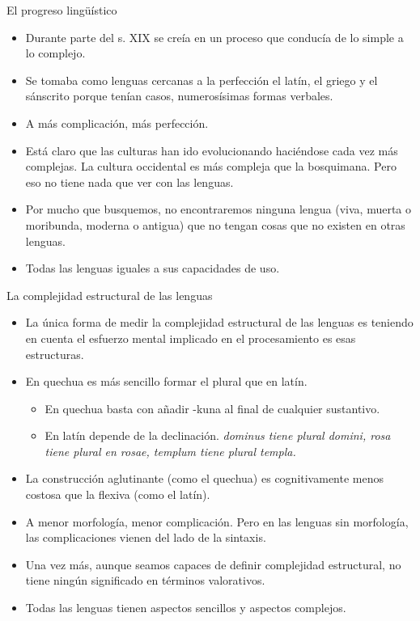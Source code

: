 \documentclass[handout]{beamer}
\begin{document}
\begin{frame}{El progreso lingüístico}
\begin{itemize}
	\item Durante parte del s. XIX se creía en un proceso que conducía de lo simple a lo complejo.
	\item Se tomaba como lenguas cercanas a la perfección el latín, el griego y el sánscrito porque tenían casos, numerosísimas formas verbales.
	\item A más complicación, más perfección.
	\item Está claro que las culturas han ido evolucionando haciéndose cada vez más complejas. La cultura occidental es más compleja que la bosquimana. Pero eso no tiene nada que ver con las lenguas.
	\item Por mucho que busquemos, no encontraremos ninguna lengua (viva, muerta o moribunda, moderna o antigua) que no tengan cosas que no existen en otras lenguas.
	\item Todas las lenguas iguales a sus capacidades de uso.
\end{itemize}

\end{frame}

\begin{frame}{La complejidad estructural de las lenguas}

\begin{itemize}
	\item La única forma de medir la complejidad estructural de las lenguas es teniendo en cuenta el esfuerzo mental implicado en el procesamiento es esas estructuras.
	\item En quechua es más sencillo formar el plural que en latín.
	\begin{itemize}
		\item En quechua basta con añadir -kuna al final de cualquier sustantivo.
		\item En latín depende de la declinación. \it{dominus} tiene plural \it{domini}, \it{rosa} tiene plural en \it{rosae}, \it{templum} tiene plural \it{templa}. 
	\end{itemize}
	\item La construcción aglutinante (como el quechua) es cognitivamente menos costosa que la flexiva (como el latín).
	\item A menor morfología, menor complicación. Pero en las lenguas sin morfología, las complicaciones vienen del lado de la sintaxis.
	\item Una vez más, aunque seamos capaces de definir complejidad estructural, no tiene ningún significado en términos valorativos.
	\item Todas las lenguas tienen aspectos sencillos y aspectos complejos. 
\end{itemize}

\end{frame}
\end{document}
